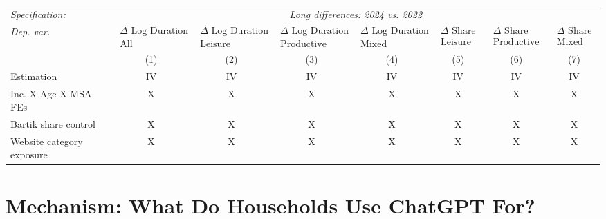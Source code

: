 \documentclass[12pt]{article}
\begin{document}
\begin{table}[htbp]
\footnotesize
 \centering \setlength{\tabcolsep}{2pt}
\begin{adjustbox}{max width=\textwidth}
\begin{tabular}{@{}l*{7}{c}@{}} 
\toprule
\textit{Specification:} &  \multicolumn{7}{c}{\textit{Long differences: 2024 vs. 2022}}\\
\cmidrule(lr){2-8} 
\addlinespace
\textit{Dep. var.} &  $\substack{\Delta \text{ Log Duration} \\ \text{All}}$  &   $\substack{\Delta \text{ Log Duration} \\ \text{Leisure}}$ &  $\substack{\Delta \text{ Log Duration} \\ \text{Productive}}$   &  $\substack{\Delta \text{ Log Duration} \\ \text{Mixed}}$   &  $\substack{\Delta \text{ Share} \\ \text{Leisure}}$  &  $\substack{\Delta \text{ Share} \\ \text{Productive}}$  &  $\substack{\Delta \text{ Share} \\ \text{Mixed}}$ \\
   \cmidrule(lr){2-2}   \cmidrule(lr){3-3}   \cmidrule(lr){4-4}   \cmidrule(lr){5-5}   \cmidrule(lr){6-6}   \cmidrule(lr){7-7}   \cmidrule(lr){8-8} 
 &  (1) & (2) & (3) & (4) & (5) & (6) & (7) \\
   \addlinespace
   \midrule

\midrule
 	Estimation & IV & IV & IV & IV & IV & IV & IV   \\ 
Inc. X Age X MSA FEs     & X & X	& X & X	& X & X	& X      \\	
Bartik share control     & X & X	& X & X	& X & X	& X      \\	
Website category exposure    & X & X	& X & X	& X & X	& X      \\	
    \bottomrule
\end{tabular}
\end{adjustbox}
\end{table}





\section{Mechanism: What Do Households Use ChatGPT For?} \label{sec:mechanism_empirics}
\end{document}
